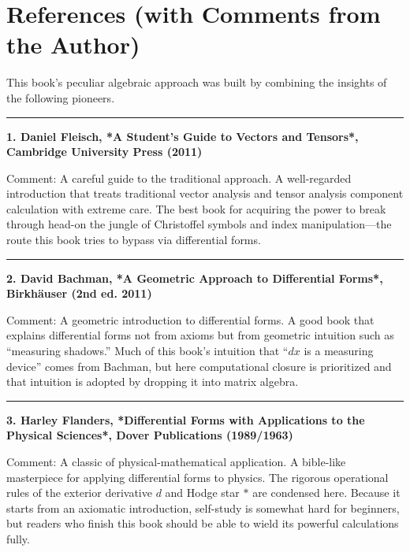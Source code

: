 \newpage

\hypertarget{references-with-comments-from-the-author}{%
\chapter{References (with Comments from the
Author)}\label{references-with-comments-from-the-author}}

This book's peculiar algebraic approach was built by combining the
insights of the following pioneers.

\begin{center}\rule{0.5\linewidth}{0.5pt}\end{center}

\textbf{1. Daniel Fleisch, *A Student's Guide to Vectors and Tensors*, Cambridge University Press (2011)}

Comment: A careful guide to the traditional approach. A well-regarded
introduction that treats traditional vector analysis and tensor analysis
component calculation with extreme care. The best book for acquiring the
power to break through head-on the jungle of Christoffel symbols and
index manipulation---the route this book tries to bypass via
differential forms.

\begin{center}\rule{0.5\linewidth}{0.5pt}\end{center}

\textbf{2. David Bachman, *A Geometric Approach to Differential Forms*, Birkhäuser (2nd ed. 2011)}

Comment: A geometric introduction to differential forms. A good book
that explains differential forms not from axioms but from geometric
intuition such as ``measuring shadows.'' Much of this book's intuition
that ``\(dx\) is a measuring device'' comes from Bachman, but here
computational closure is prioritized and that intuition is adopted by
dropping it into matrix algebra.

\begin{center}\rule{0.5\linewidth}{0.5pt}\end{center}

\textbf{3. Harley Flanders, *Differential Forms with Applications to the Physical Sciences*, Dover Publications (1989/1963)}

Comment: A classic of physical-mathematical application. A bible-like
masterpiece for applying differential forms to physics. The rigorous
operational rules of the exterior derivative \(d\) and Hodge star
\(\ast\) are condensed here. Because it starts from an axiomatic
introduction, self-study is somewhat hard for beginners, but readers who
finish this book should be able to wield its powerful calculations
fully.

